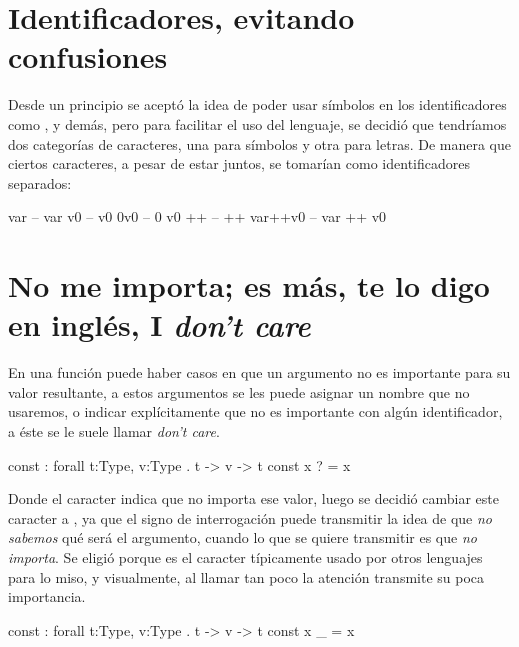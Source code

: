 {\section{Identificadores, evitando confusiones}

\begin{designfr}
Desde un principio se aceptó la idea de poder usar símbolos en los identificadores como \inlinecode{+}, \inlinecode{*} y demás, pero para facilitar el uso del lenguaje, se decidió que tendríamos dos categorías de caracteres, una para símbolos y otra para letras. De manera que ciertos caracteres, a pesar de estar juntos, se tomarían como identificadores separados:

\begin{anglercode}
var         -- var
v0          -- v0
0v0         -- 0 v0
++          -- ++
var++v0     -- var ++ v0
\end{anglercode}
\end{designfr}

\section{No me importa; es más, te lo digo en inglés, I \emph{don't care}}

\begin{designfr}
En una función puede haber casos en que un argumento no es importante para su valor resultante, a estos argumentos se les puede asignar un nombre que no usaremos, o indicar explícitamente que no es importante con algún identificador, a éste se le suele llamar \emph{don't care}.

\begin{anglercode}[alsoletter={?},morekeywords={?}]
const : forall t:Type, v:Type . t -> v -> t
const x ? = x
\end{anglercode}

Donde el caracter  indica que no importa ese valor, luego se decidió cambiar este caracter a \inlinecode{\_}, ya que el signo de interrogación puede transmitir la idea de que \emph{no sabemos} qué será el argumento, cuando lo que se quiere transmitir es que \emph{no importa}. Se eligió \inlinecode{\_} porque es el caracter típicamente usado por otros lenguajes para lo miso, y visualmente, al llamar tan poco la atención transmite su poca importancia.

\begin{anglercode}[morekeywords={\_}]
const : forall t:Type, v:Type . t -> v -> t
const x _ = x
\end{anglercode}
\end{designfr}

}
